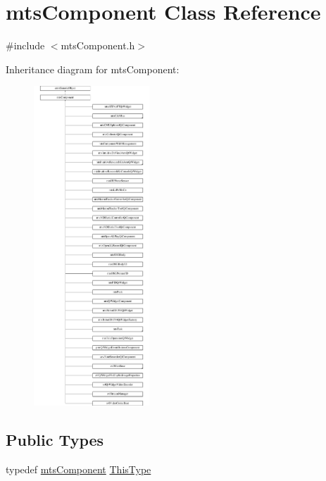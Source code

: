 \hypertarget{classmts_component}{\section{mts\-Component Class Reference}
\label{classmts_component}
}


{\ttfamily \#include $<$mts\-Component.\-h$>$}

Inheritance diagram for mts\-Component\-:\begin{figure}[H]
\begin{center}
\leavevmode
\includegraphics[height=12.000000cm]{d6/d28/classmts_component}
\end{center}
\end{figure}
\subsection*{Public Types}
\begin{DoxyCompactItemize}
\item 
typedef \hyperlink{classmts_component}{mts\-Component} \hyperlink{classmts_component_a938b0f369786119d9fa6426a2e3df112}{This\-Type}
\end{DoxyCompactItemize}
